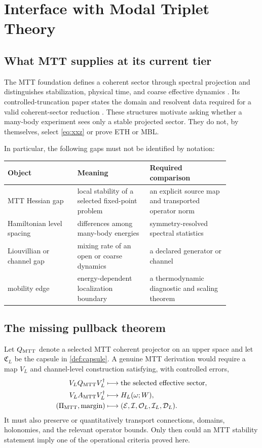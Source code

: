 \documentclass[11pt]{article}
\newcommand{\Obs}{\mathcal O}
\newcommand{\EE}{\mathcal E}
\newcommand{\II}{\mathcal I}
\begin{document}
\section{Interface with Modal Triplet Theory}

\subsection{What MTT supplies at its current tier}

The MTT foundation defines a coherent sector through spectral projection
and distinguishes stabilization, physical time, and coarse effective
dynamics \cite{nero_foundation}.  Its controlled-truncation paper states
the domain and resolvent data required for a valid coherent-sector
reduction \cite{nero_truncation}.  These structures motivate asking
whether a many-body experiment sees only a stable projected sector.
They do not, by themselves, select \cref{eq:xxz} or prove ETH or MBL.

In particular, the following gaps must not be identified by notation:
\begin{center}
\begin{tabular}{
>{\raggedright\arraybackslash}p{0.27\linewidth}
>{\raggedright\arraybackslash}p{0.29\linewidth}
>{\raggedright\arraybackslash}p{0.31\linewidth}}
\toprule
Object & Meaning & Required comparison \\
\midrule
MTT Hessian gap & local stability of a selected fixed-point problem &
an explicit source map and transported operator norm \\
Hamiltonian level spacing & differences among many-body energies &
symmetry-resolved spectral statistics \\
Liouvillian or channel gap & mixing rate of an open or coarse dynamics &
a declared generator or channel \\
mobility edge & energy-dependent localization boundary &
a thermodynamic diagnostic and scaling theorem \\
\bottomrule
\end{tabular}
\end{center}

\subsection{The missing pullback theorem}

Let $Q_{\rm MTT}$ denote a selected MTT coherent projector on an upper
space and let $\mathfrak C_L$ be the capsule in
\cref{def:capsule}.  A genuine MTT derivation would require a map
$V_L$ and channel-level construction satisfying, with controlled errors,
\begin{align}
 V_L Q_{\rm MTT} V_L^\dagger &\longmapsto
 \text{the selected effective sector},\\
 V_L A_{\rm MTT} V_L^\dagger &\longmapsto H_L(\omega;W),\\
 (\Pi_{\rm MTT},\text{margin}) &\longmapsto
 (\EE,\II,\Obs_L,\mathcal I_L,\mathcal D_L).
\end{align}
It must also preserve or quantitatively transport connections, domains,
holonomies, and the relevant operator bounds.  Only then could an MTT
stability statement imply one of the operational criteria proved here.
\end{document}
